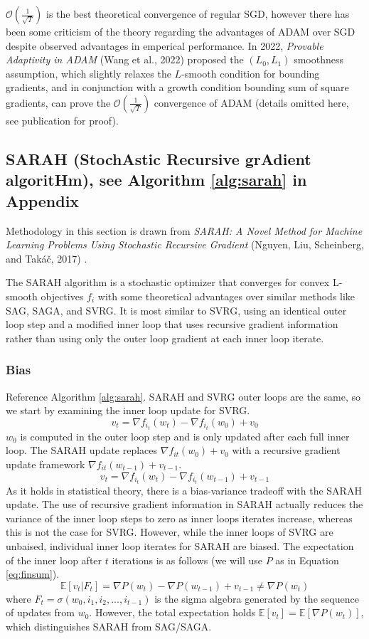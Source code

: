 \documentclass[letterpaper,11 pt]{article}
\begin{document}
$\mathcal{O}\left(\frac{1}{\sqrt{T}}\right)$ is the best theoretical convergence of regular SGD, however there has been some criticism of the theory regarding the advantages of ADAM over SGD despite observed advantages in emperical performance.  In 2022, \textit{Provable Adaptivity in ADAM} (Wang et al., 2022) \cite{wangprovable} proposed the $(L_{0},L_{1})$ smoothness assumption, which slightly relaxes the $L$-smooth condition for bounding gradients, and in conjunction with a growth condition bounding sum of square gradients, can prove the $\mathcal{O}\left(\frac{1}{\sqrt{T}}\right)$ convergence of ADAM (details omitted here, see publication for proof).
%


\subsection{SARAH (StochAstic Recursive grAdient algoritHm), see Algorithm \ref{alg:sarah} in Appendix}
Methodology in this section is drawn from \textit{SARAH: A Novel Method for Machine Learning Problems Using Stochastic Recursive Gradient} (Nguyen, Liu, Scheinberg, and Takáč, 2017)  \cite{nguyen}.

The SARAH algorithm is a stochastic optimizer that converges for convex L-smooth objectives $f_{i}$ with some theoretical advantages over similar methods like SAG, SAGA, and SVRG. It is most similar to SVRG, using an identical outer loop step and a modified inner loop that uses recursive gradient information rather than using only the outer loop gradient at each inner loop iterate.


\subsubsection{Bias}

Reference Algorithm \ref{alg:sarah}. SARAH and SVRG outer loops are the same, so we start by examining the inner loop update for SVRG.
\[
v_{t} = \nabla f_{i_{t}} (w_{t}) - \nabla f_{i_{t}} (w_{0}) + v_{0}
\]
$w_{0}$ is computed in the outer loop step and is only updated after each full inner loop. The SARAH update replaces $\nabla f_{it}(w_{0})+v_{0}$ with a recursive gradient update framework $\nabla f_{it}(w_{t-1})+v_{t-1}$.
\[
v_{t} = \nabla f_{i_{t}} (w_{t}) - \nabla f_{i_{t}} (w_{t-1}) + v_{t-1}
\]
As it holds in statistical theory, there is a bias-variance tradeoff with the SARAH update. The use of recursive gradient information in SARAH actually reduces the variance of the inner loop steps to zero as inner loops iterates increase, whereas this is not the case for SVRG. However, while the inner loops of SVRG are unbaised, individual inner loop iterates for SARAH are biased. The expectation of the inner loop after $t$ iterations is as follows (we will use $P$ as in Equation \ref{eq:finsum}).
\[
\mathbb{E}[v_{t}|F_{t}]=\nabla{P}(w_{t}) - \nabla{P}(w_{t-1}) + v_{t-1} \neq \nabla{P}(w_{t})
\]
where $F_{t} = \sigma (w_{0}, i_{1},i_{2},...,i_{t-1})$ is the sigma algebra generated by the sequence of updates from $w_{0}$.  However, the total expectation holds $\mathbb{E}[v_{t}] = \mathbb{E}[\nabla{P}(w_{t})]$, which distinguishes SARAH from SAG/SAGA.
\end{document}
